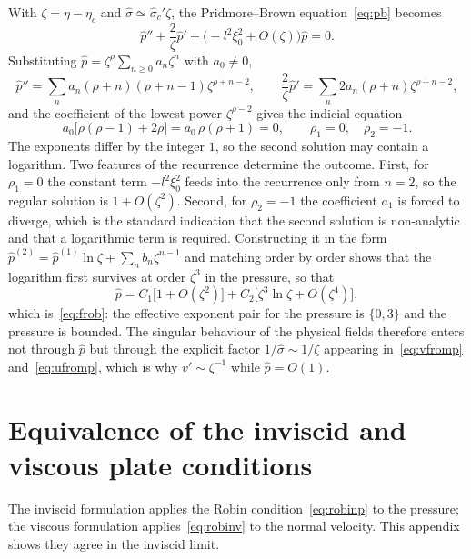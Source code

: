 \documentclass[11pt,a4paper]{article}
\newcommand{\sig}{\hat\sigma}
\theoremstyle{plain}
\theoremstyle{remark}
\begin{document}
With $\zeta=\eta-\eta_c$ and $\sig\simeq\sig_c'\zeta$, the Pridmore--Brown equation~\eqref{eq:pb}
becomes
\begin{equation}
\hat p''+\frac{2}{\zeta}\hat p'+\bigl(-l^2\xi_0^2+O(\zeta)\bigr)\hat p=0 .
\label{eq:appfrob}
\end{equation}
Substituting $\hat p=\zeta^\rho\sum_{n\ge0}a_n\zeta^n$ with $a_0\ne0$,
\begin{equation}
\hat p''=\sum_na_n(\rho+n)(\rho+n-1)\zeta^{\rho+n-2},
\qquad
\frac{2}{\zeta}\hat p'=\sum_n2a_n(\rho+n)\zeta^{\rho+n-2},
\end{equation}
and the coefficient of the lowest power $\zeta^{\rho-2}$ gives the indicial equation
\begin{equation}
a_0\bigl[\rho(\rho-1)+2\rho\bigr]=a_0\,\rho(\rho+1)=0,
\qquad \rho_1=0,\quad\rho_2=-1 .
\end{equation}
The exponents differ by the integer $1$, so the second solution may contain a logarithm. Two features
of the recurrence determine the outcome. First, for $\rho_1=0$ the constant term $-l^2\xi_0^2$ feeds
into the recurrence only from $n=2$, so the regular solution is $1+O(\zeta^2)$. Second, for
$\rho_2=-1$ the coefficient $a_1$ is forced to diverge, which is the standard indication that the
second solution is non-analytic and that a logarithmic term is required. Constructing it in the form
$\hat p^{(2)}=\hat p^{(1)}\ln\zeta+\sum_nb_n\zeta^{n-1}$ and matching order by order shows that the
logarithm first survives at order $\zeta^3$ in the pressure, so that
\begin{equation}
\hat p=C_1\bigl[1+O(\zeta^2)\bigr]+C_2\bigl[\zeta^3\ln\zeta+O(\zeta^4)\bigr],
\end{equation}
which is~\eqref{eq:frob}: the effective exponent pair for the pressure is $\{0,3\}$ and the pressure is
bounded. The singular behaviour of the physical fields therefore enters not through $\hat p$ but
through the explicit factor $1/\sig\sim1/\zeta$ appearing in~\eqref{eq:vfromp}
and~\eqref{eq:ufromp}, which is why $v'\sim\zeta^{-1}$ while $\hat p=O(1)$.

\section{Equivalence of the inviscid and viscous plate conditions}\label{app:bc}

The inviscid formulation applies the Robin condition~\eqref{eq:robinp} to the pressure; the viscous
formulation applies~\eqref{eq:robinv} to the normal velocity. This appendix shows they agree in the
inviscid limit.
\end{document}
